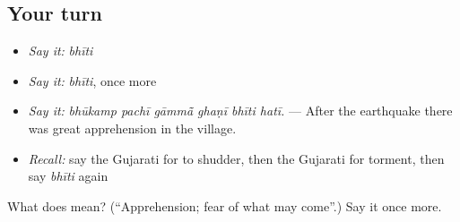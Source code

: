 \subsection*{Your turn}
\begin{itemize}
\raggedright
  \item \emph{Say it:} \emph{bhīti}
  \item \emph{Say it:} \emph{bhīti}, once more
  \item \emph{Say it:} \emph{bhūkamp pachī gāmmā̃ ghaṇī bhīti hatī.} — After the earthquake there was great apprehension in the village.
  \item \emph{Recall:} say the Gujarati for to shudder, then the Gujarati for torment, then say \emph{bhīti} again
\end{itemize}

\begin{tcolorbox}[breakable,colback=teal!4,colframe=teal!35!black,title={Before you move on}]
What does  mean? (\textquotedblleft{}Apprehension; fear of what may come\textquotedblright{}.) Say it once more.
\end{tcolorbox}
